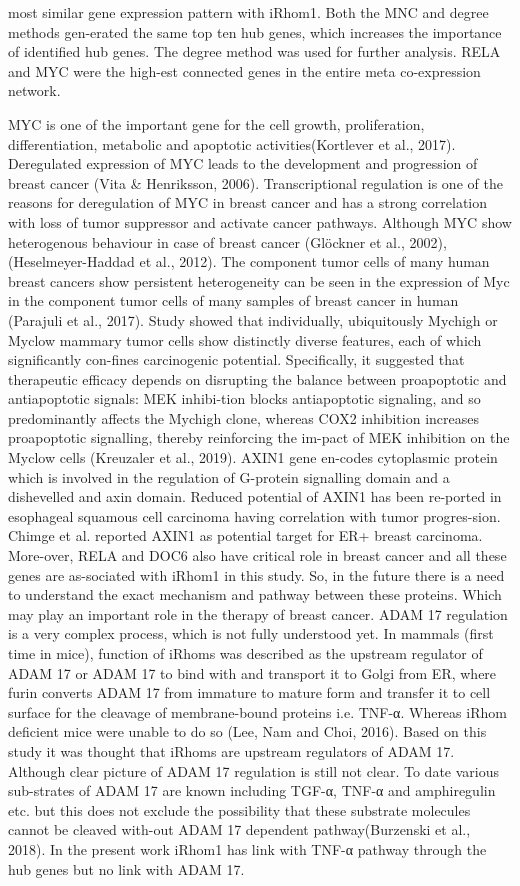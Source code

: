 \documentclass[fleqn,10pt,lineno]{wlpeerj}
\begin{document}
most similar gene expression pattern with iRhom1. Both the MNC and degree methods gen-erated the same top ten hub genes, which increases the importance of identified hub genes. The degree method was used for further analysis. RELA and MYC were the high-est connected genes in the entire meta co-expression network. 

MYC is one of the important gene for the cell growth, proliferation, differentiation, metabolic and apoptotic activities(Kortlever et al., 2017). Deregulated expression of MYC leads to the development and progression of breast cancer (Vita & Henriksson, 2006). Transcriptional regulation is one of the reasons for deregulation of MYC in breast cancer and has a strong correlation with loss of tumor suppressor and activate cancer pathways. Although MYC show heterogenous behaviour in case of breast cancer (Glöckner et al., 2002),(Heselmeyer-Haddad et al., 2012). The component tumor cells of many human breast cancers show persistent heterogeneity can be seen in the expression of Myc in the component tumor cells of many samples of breast cancer in human (Parajuli et al., 2017). Study showed that individually, ubiquitously Mychigh or Myclow mammary tumor cells show distinctly diverse features, each of which significantly con-fines carcinogenic potential. Specifically, it suggested that therapeutic efficacy depends on disrupting the balance between proapoptotic and antiapoptotic signals: MEK inhibi-tion blocks antiapoptotic signaling, and so predominantly affects the Mychigh clone, whereas COX2 inhibition increases proapoptotic signalling, thereby reinforcing the im-pact of MEK inhibition on the Myclow cells (Kreuzaler et al., 2019). AXIN1 gene en-codes cytoplasmic protein which is involved in the regulation of G-protein signalling domain and a dishevelled and axin domain. Reduced potential of AXIN1 has been re-ported in esophageal squamous cell carcinoma having correlation with tumor progres-sion. Chimge et al. reported AXIN1 as potential target for ER+ breast carcinoma. More-over, RELA and DOC6 also have critical role in breast cancer and all these genes are as-sociated with iRhom1 in this study. So, in the future there is a need to understand the exact mechanism and pathway between these proteins. Which may play an important role in the therapy of breast cancer.  ADAM 17 regulation is a very complex process, which is not fully understood yet.  In mammals (first time in mice), function of iRhoms was described as the upstream regulator of ADAM 17 or ADAM 17 to bind with and transport it to Golgi from ER, where furin converts ADAM 17 from immature to mature form and transfer it to cell surface for the cleavage of membrane-bound proteins i.e. TNF-α. Whereas iRhom deficient mice were unable to do so (Lee, Nam and Choi, 2016). Based on this study it was thought that iRhoms are upstream regulators of ADAM 17. Although clear picture of ADAM 17 regulation is still not clear. To date various sub-strates of ADAM 17 are known including TGF-α, TNF-α and amphiregulin etc. but this does not exclude the possibility that these substrate molecules cannot be cleaved with-out ADAM 17 dependent pathway(Burzenski et al., 2018). In the present work iRhom1 has link with TNF-α pathway through the hub genes but no link with ADAM 17. 
\end{document}
